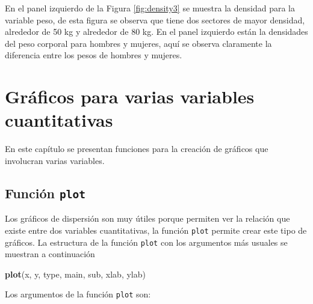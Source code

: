 \documentclass[10pt,]{krantz}
\makeatletter
\newenvironment{Shaded}{\begin{snugshade}}{\end{snugshade}}
\newcommand{\KeywordTok}[1]{\textcolor[rgb]{0.13,0.29,0.53}{\textbf{{#1}}}}
\newcommand{\NormalTok}[1]{{#1}}
\newenvironment{kframe}{%
\medskip{}
\setlength{\fboxsep}{.8em}
 \def\at@end@of@kframe{}%
 \ifinner\ifhmode%
  \def\at@end@of@kframe{\end{minipage}}%
  \begin{minipage}{\columnwidth}%
 \fi\fi%
 \def\FrameCommand##1{\hskip\@totalleftmargin \hskip-\fboxsep
 \colorbox{shadecolor}{##1}\hskip-\fboxsep
     \hskip-\linewidth \hskip-\@totalleftmargin \hskip\columnwidth}%
 \MakeFramed {\advance\hsize-\width
   \@totalleftmargin\z@ \linewidth\hsize
   \@setminipage}}%
 {\par\unskip\endMakeFramed%
 \at@end@of@kframe}
\renewenvironment{Shaded}{\begin{kframe}}{\end{kframe}}
\makeatother
\begin{document}
En el panel izquierdo de la Figura \ref{fig:density3} se muestra la
densidad para la variable peso, de esta figura se observa que tiene dos
sectores de mayor densidad, alrededor de 50 kg y alrededor de 80 kg. En
el panel izquierdo están la densidades del peso corporal para hombres y
mujeres, aquí se observa claramente la diferencia entre los pesos de
hombres y mujeres.

\chapter{Gráficos para varias variables
cuantitativas}\label{graficos-para-varias-variables-cuantitativas}

En este capítulo se presentan funciones para la creación de gráficos que
involucran varias variables.

\section{\texorpdfstring{Función \texttt{plot} 
}{Función plot  }}\label{funcion-plot}

Los gráficos de dispersión son muy útiles porque permiten ver la
relación que existe entre dos variables cuantitativas, la función
\texttt{plot} permite crear este tipo de gráficos. La estructura de la
función \texttt{plot} con los argumentos más usuales se muestran a
continuación

\begin{Shaded}
\begin{Highlighting}[]
\KeywordTok{plot}\NormalTok{(x, y, type, main, sub, xlab, ylab)}
\end{Highlighting}
\end{Shaded}

Los argumentos de la función \texttt{plot} son:
\end{document}
